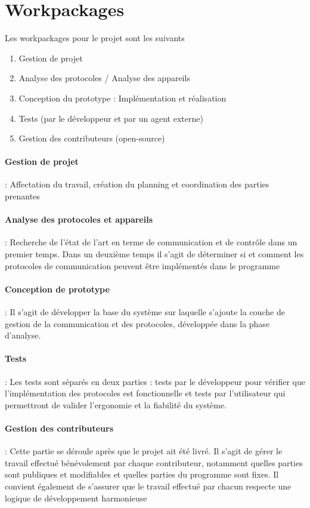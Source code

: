 \documentclass[AdvProjMgmt_Sebastien_Deriaz]{subfiles}
\begin{document}
\section{Workpackages}
Les workpackages pour le projet sont les suivants
\begin{enumerate}[leftmargin=2cm,label={WP\arabic*  :}]
\item Gestion de projet
\item Analyse des protocoles / Analyse des appareils
\item Conception du prototype : Implémentation et réalisation
\item Tests (par le développeur et par un agent externe)
\item Gestion des contributeurs (open-source)
\end{enumerate}
\paragraph{Gestion de projet} : Affectation du travail, création du planning et coordination des parties prenantes
\paragraph{Analyse des protocoles et appareils} : Recherche de l'état de l'art en terme de communication et de contrôle dans un premier temps. Dans un deuxième temps il s'agit de déterminer si et comment les protocoles de communication peuvent être implémentés dans le programme
\paragraph{Conception de prototype} : Il s'agit de développer la base du système sur laquelle s'ajoute la couche de gestion de la communication et des protocoles, développée dans la phase d'analyse.
\paragraph{Tests} : Les tests sont séparés en deux parties : tests par le développeur pour vérifier que l'implémentation des protocoles est fonctionnelle et tests par l'utilisateur qui permettront de valider l'ergonomie et la fiabilité du système.
\paragraph{Gestion des contributeurs} : Cette partie se déroule après que le projet ait été livré. Il s'agit de gérer le travail effectué bénévolement par chaque contributeur, notamment quelles parties sont publiques et modifiables et quelles parties du programme sont fixes. Il convient également de s'assurer que le travail effectué par chacun respecte une logique de développement harmonieuse
\end{document}
